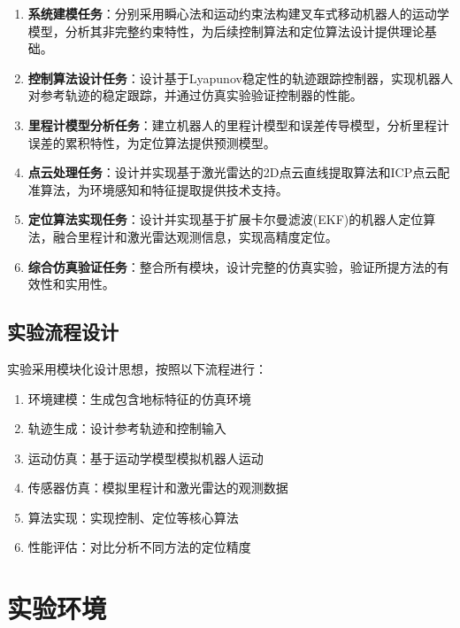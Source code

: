\documentclass[12pt,a4paper]{report}
\begin{document}
\begin{enumerate}[itemsep=0pt]
    \item \textbf{系统建模任务}：分别采用瞬心法和运动约束法构建叉车式移动机器人的运动学模型，分析其非完整约束特性，为后续控制算法和定位算法设计提供理论基础。
    
    \item \textbf{控制算法设计任务}：设计基于Lyapunov稳定性的轨迹跟踪控制器，实现机器人对参考轨迹的稳定跟踪，并通过仿真实验验证控制器的性能。
    
    \item \textbf{里程计模型分析任务}：建立机器人的里程计模型和误差传导模型，分析里程计误差的累积特性，为定位算法提供预测模型。
    
    \item \textbf{点云处理任务}：设计并实现基于激光雷达的2D点云直线提取算法和ICP点云配准算法，为环境感知和特征提取提供技术支持。
    
    \item \textbf{定位算法实现任务}：设计并实现基于扩展卡尔曼滤波(EKF)的机器人定位算法，融合里程计和激光雷达观测信息，实现高精度定位。
    
    \item \textbf{综合仿真验证任务}：整合所有模块，设计完整的仿真实验，验证所提方法的有效性和实用性。
\end{enumerate}

\subsection{实验流程设计}

实验采用模块化设计思想，按照以下流程进行：

\begin{enumerate}[itemsep=0pt]
    \item 环境建模：生成包含地标特征的仿真环境
    \item 轨迹生成：设计参考轨迹和控制输入
    \item 运动仿真：基于运动学模型模拟机器人运动
    \item 传感器仿真：模拟里程计和激光雷达的观测数据
    \item 算法实现：实现控制、定位等核心算法
    \item 性能评估：对比分析不同方法的定位精度
\end{enumerate}

\section{实验环境}
\end{document}
